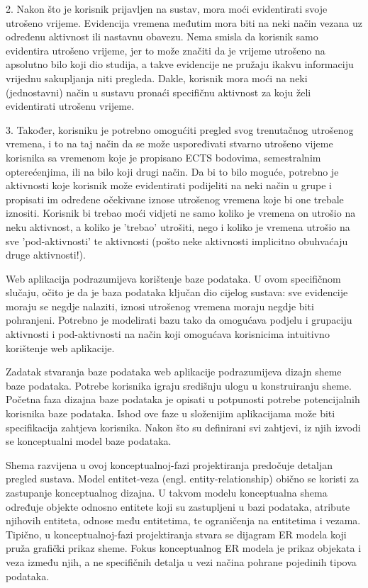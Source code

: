 \documentclass[times, utf8, zavrsni]{fer}
\begin{document}
2. Nakon što je korisnik prijavljen na sustav, mora moći evidentirati svoje utrošeno vrijeme. Evidencija vremena međutim mora biti na neki način vezana uz određenu aktivnost ili nastavnu obavezu. Nema smisla da korisnik samo evidentira utrošeno vrijeme, jer to može značiti da je vrijeme utrošeno na apsolutno bilo koji dio studija, a takve evidencije ne pružaju ikakvu informaciju vrijednu sakupljanja niti pregleda. Dakle, korisnik mora moći na neki (jednostavni) način u sustavu pronaći specifičnu aktivnost za koju želi evidentirati utrošenu vrijeme.

3. Također, korisniku je potrebno omogućiti pregled svog trenutačnog utrošenog vremena, i to na taj način da se može uspoređivati stvarno utrošeno vijeme korisnika sa vremenom koje je propisano ECTS bodovima, semestralnim opterećenjima, ili na bilo koji drugi način. Da bi to bilo moguće, potrebno je aktivnosti koje korisnik može evidentirati podijeliti na neki način u grupe i propisati im određene očekivane iznose utrošenog vremena koje bi one trebale iznositi. Korisnik bi trebao moći vidjeti ne samo koliko je vremena on utrošio na neku aktivnost, a koliko je 'trebao' utrošiti, nego i koliko je vremena utrošio na sve 'pod-aktivnosti' te aktivnosti (pošto neke aktivnosti implicitno obuhvaćaju druge aktivnosti!).

Web aplikacija podrazumijeva korištenje baze podataka. U ovom specifičnom slučaju, očito je da je baza podataka ključan dio cijelog sustava: sve evidencije moraju se negdje nalaziti, iznosi utrošenog vremena moraju negdje biti pohranjeni. Potrebno je modelirati bazu tako da omogućava podjelu i grupaciju aktivnosti i pod-aktivnosti na način koji omogućava korisnicima intuitivno korištenje web aplikacije.

Zadatak stvaranja baze podataka web aplikacije podrazumijeva dizajn sheme baze podataka. Potrebe korisnika igraju središnju ulogu u konstruiranju sheme. Početna faza dizajna baze podataka je opisati u potpunosti potrebe potencijalnih korisnika baze podataka. Ishod ove faze u složenijim aplikacijama može biti specifikacija zahtjeva korisnika. Nakon što su definirani svi zahtjevi, iz njih izvodi se konceptualni model baze podataka. 

Shema razvijena u ovoj konceptualnoj-fazi projektiranja predočuje detaljan pregled sustava. Model entitet-veza (engl. entity-relationship) obično se koristi za zastupanje konceptualnog dizajna. U takvom modelu konceptualna shema određuje objekte odnosno entitete koji su zastupljeni u bazi podataka, atribute njihovih entiteta, odnose među entitetima, te ograničenja na entitetima i vezama. Tipično, u konceptualnoj-fazi projektiranja stvara se dijagram ER modela koji pruža grafički prikaz sheme.
Fokus konceptualnog ER modela je prikaz objekata i veza između njih, a ne specifičnih detalja u vezi načina pohrane pojedinih tipova podataka.
\end{document}
